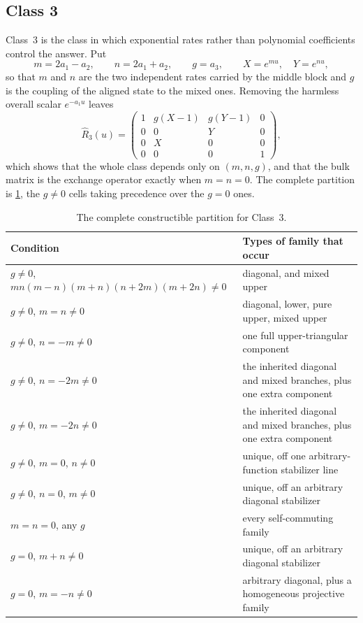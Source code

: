 \documentclass[11pt,reqno]{amsart}
\theoremstyle{plain}
\theoremstyle{definition}
\theoremstyle{remark}
\numberwithin{equation}{section}
\begin{document}
\subsection{Class 3}
\label{subsec:c3}

Class~3 is the class in which exponential rates rather than polynomial
coefficients control the answer. Put
\begin{equation}
m=2a_1-a_2,\qquad n=2a_1+a_2,\qquad g=a_3,
\qquad X=e^{mu},\quad Y=e^{nu},                    \label{eq:C3-vars}
\end{equation}
so that $m$ and $n$ are the two independent rates carried by the middle block and
$g$ is the coupling of the aligned state to the mixed ones. Removing the harmless
overall scalar $e^{-a_1u}$ leaves
\begin{equation}
\widehat R_3(u)=\begin{pmatrix}
1&g(X-1)&g(Y-1)&0\\0&0&Y&0\\0&X&0&0\\0&0&0&1
\end{pmatrix},                                      \label{eq:C3-bulk}
\end{equation}
which shows that the whole class depends only on $(m,n,g)$, and that the bulk
matrix is the exchange operator exactly when $m=n=0$. The complete partition is
\cref{tab:C3-cells}, the $g\ne0$ cells taking precedence over the $g=0$ ones.

\begin{table}[t]
\centering\footnotesize
\caption{The complete constructible partition for Class~3.}
\label{tab:C3-cells}
\begin{tabularx}{\textwidth}{>{\RaggedRight\arraybackslash}X >{\RaggedRight\arraybackslash}X}
\toprule
Condition & Types of family that occur \\
\midrule
$g\ne0$, $mn(m-n)(m+n)(n+2m)(m+2n)\ne0$ & diagonal, and mixed upper \\
$g\ne0$, $m=n\ne0$ & diagonal, lower, pure upper, mixed upper \\
$g\ne0$, $n=-m\ne0$ & one full upper-triangular component \\
$g\ne0$, $n=-2m\ne0$ & the inherited diagonal and mixed branches, plus one extra component \\
$g\ne0$, $m=-2n\ne0$ & the inherited diagonal and mixed branches, plus one extra component \\
$g\ne0$, $m=0$, $n\ne0$ & unique, off one arbitrary-function stabilizer line \\
$g\ne0$, $n=0$, $m\ne0$ & unique, off an arbitrary diagonal stabilizer \\
$m=n=0$, any $g$ & every self-commuting family \\
$g=0$, $m+n\ne0$ & unique, off an arbitrary diagonal stabilizer \\
$g=0$, $m=-n\ne0$ & arbitrary diagonal, plus a homogeneous projective family \\
\bottomrule
\end{tabularx}
\end{table}
\end{document}
